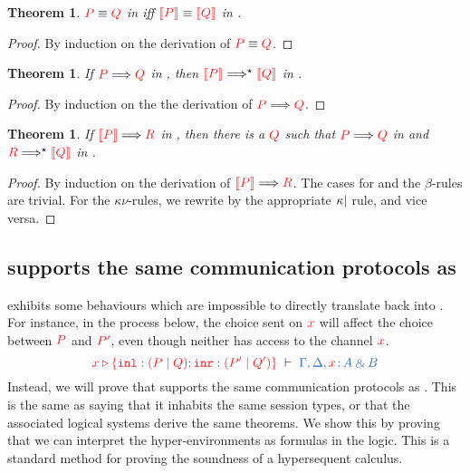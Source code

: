 \documentclass[submission,copyright,creativecommons]{eptcs}
\newtheorem{theorem}[lemma]{Theorem}
\begin{document}
\begin{theorem}\label{thm:cp2hcp-equiv}
  $\tm{P}\equiv\tm{Q}$ in \cp iff $\tm{\mtf{P}}\equiv\tm{\mtf{Q}}$ in \hcp.
\end{theorem}\vspace*{-0.75\baselineskip}%
\begin{proof}
  By induction on the derivation of $\tm{P}\equiv\tm{Q}$.
\end{proof}%
\begin{theorem}\label{thm:cp2hcp-reduction}
  If $\reducesto{P}{Q}$ in \cp, then $\tm{\mtf{P}}\Longrightarrow^\star\tm{\mtf{Q}}$ in \hcp.
\end{theorem}\vspace*{-0.75\baselineskip}%
\begin{proof}
  By induction on the the derivation of $\reducesto{P}{Q}$.
\end{proof}%
\begin{theorem}\label{hcp2cp-reduction}
  If $\reducesto{\mtf{P}}{R}$ in \hcp, then there is a $\tm{Q}$ such that $\reducesto{P}{Q}$ in \cp and $\tm{R}\Longrightarrow^\star\tm{\mtf{Q}}$ in \hcp.
\end{theorem}\vspace*{-0.75\baselineskip}%
\begin{proof}
  By induction on the derivation of $\reducesto{\mtf{P}}{R}$. The cases for  and the $\beta$-rules are trivial. For the $\kappa\nu$-rules, we rewrite by the appropriate $\kappa{\ensuremath{\mid}}$ rule, and vice versa.
\end{proof}\noindent

\subsection{\hcp supports the same communication protocols as \cp}
\hcp exhibits some behaviours which are impossible to directly translate back into \cp. For instance, in the process below, the choice sent on $\tm{x}$ will affect the choice between $\tm{P}$ and $\tm{P'}$, even though neither has access to the channel $\tm{x}$.
\[
  \seq[\cpCase{x}{(\piPar{P}{Q})}{(\piPar{P'}{Q'})}]{
    \Gamma, \Delta, \tmty{x}{A \with B}}
\]
Instead, we will prove that \hcp supports the same communication protocols as \cp. This is the same as saying that it inhabits the same session types, or that the associated logical systems derive the same theorems. We show this by proving that we can interpret the hyper-environments as formulas in the logic. This is a standard method for proving the soundness of a hypersequent calculus.
\end{document}
